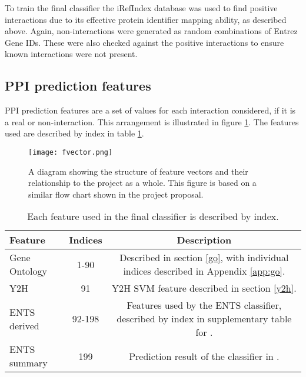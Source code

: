 To train the final classifier the iRefIndex\autocite{razick_irefindex:_2008} database was used to find positive interactions due to its effective protein identifier mapping ability, as described above.
Again, non-interactions were generated as random combinations of Entrez Gene IDs.
These were also checked against the positive interactions to ensure known interactions were not present.

\subsection{PPI prediction features}

PPI prediction features are a set of values for each interaction considered, if it is a real or non-interaction.
This arrangement is illustrated in figure \ref{fig:fvectors}.
The features used are described by index in table \ref{tab:fvectors}.

\begin{figure}
    \centering
    \texttt{[image: fvector.png]}
    \caption{A diagram showing the structure of feature vectors and their relationship to the project as a whole. This figure is based on a similar flow chart shown in the project proposal.}
    \label{fig:fvectors}
\end{figure}

\begin{table}
    \centering
    \begin{tabular}{l c c}
        Feature         & Indices & Description \\
        \hline
        Gene Ontology   & 1-90    & Described in section \ref{go}, with individual indices described in Appendix \ref{app:go}. \\
        Y2H             & 91      & Y2H SVM feature described in section \ref{y2h}. \\
        ENTS derived    & 92-198  & Features used by the ENTS classifier, described by index in supplementary table for \textcite{rodgers-melnick_predicting_2013}. \\
        ENTS summary    & 199     & Prediction result of the classifier in \textcite{rodgers-melnick_predicting_2013}. \\
    \end{tabular}
    \caption{Each feature used in the final classifier is described by index.}
    \label{tab:fvectors}
\end{table}

